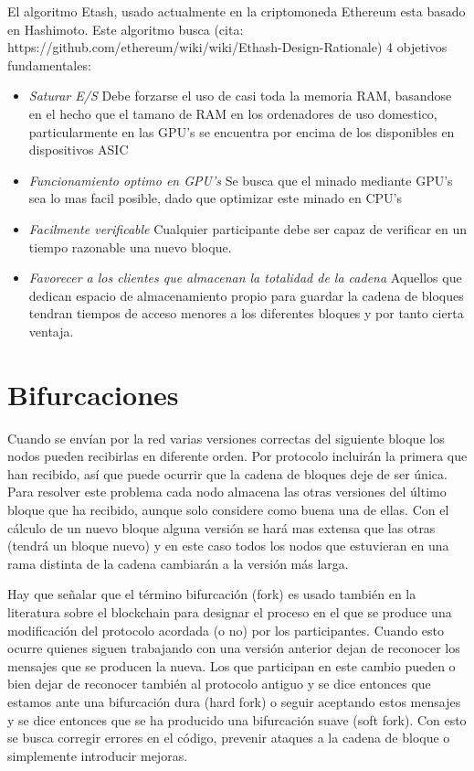 El algoritmo Etash, usado actualmente en la criptomoneda Ethereum esta basado en Hashimoto. Este algoritmo busca (cita: https://github.com/ethereum/wiki/wiki/Ethash-Design-Rationale) 4 objetivos fundamentales:
\begin{itemize}
    \item \textit{Saturar E/S} Debe forzarse el uso de casi toda la memoria RAM, basandose en el hecho que el tamano de RAM en los ordenadores de uso domestico, particularmente en las GPU's se encuentra por encima de los disponibles en dispositivos ASIC
    \item \textit{Funcionamiento optimo en GPU's} Se busca que el minado mediante GPU's sea lo mas facil posible, dado que optimizar este minado en CPU's 
    \item \textit{Facilmente verificable} Cualquier participante debe ser capaz de verificar en un tiempo razonable una nuevo bloque.
    \item \textit{Favorecer a los clientes que almacenan la totalidad de la cadena} Aquellos que dedican espacio de almacenamiento propio para guardar la cadena de bloques tendran tiempos de acceso menores a los diferentes bloques y por tanto cierta ventaja.
\end{itemize}


\section{Bifurcaciones}\label{cap3:bifurcaciones}
Cuando se envían por la red varias versiones correctas del siguiente bloque los nodos pueden recibirlas en diferente orden. Por protocolo incluirán la primera que han recibido, así que puede ocurrir que la cadena de bloques deje de ser única. Para resolver este problema cada nodo almacena las otras versiones del último bloque que ha recibido, aunque solo considere como buena una de ellas. Con el cálculo de un nuevo bloque alguna versión se hará mas extensa que las otras (tendrá un bloque nuevo) y en este caso todos los nodos que estuvieran en una rama distinta de la cadena cambiarán a la versión más larga.

Hay que señalar que el término bifurcación (fork) es usado también en la literatura sobre el blockchain para designar el proceso en el que se produce una modificación del protocolo acordada (o no) por los participantes. Cuando esto ocurre quienes siguen trabajando con una versión anterior dejan de reconocer los mensajes que se producen la nueva. Los que participan en este cambio pueden o bien dejar de reconocer también al protocolo antiguo y se dice entonces que estamos ante una bifurcación dura (hard fork) o seguir aceptando estos mensajes y se dice entonces que se ha producido una bifurcación suave (soft fork). Con esto se busca corregir errores en el código, prevenir ataques a la cadena de bloque o simplemente introducir mejoras.

